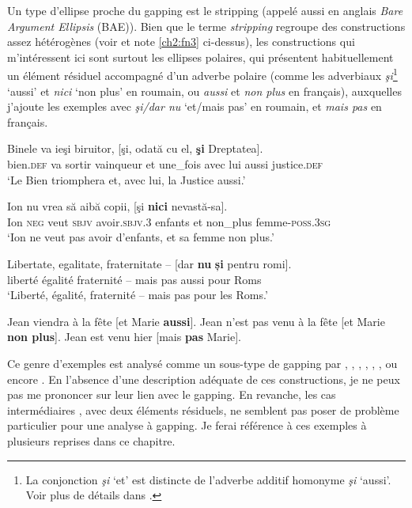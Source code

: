 Un type d’ellipse proche du gapping est le stripping (appelé aussi en anglais \textit{Bare Argument Ellipsis} (BAE)). Bien que le terme \textit{stripping} regroupe des constructions assez hétérogènes (voir \citealt{Abeille2006} et note \ref{ch2:fn3} ci-dessus), les constructions qui m’intéressent ici sont surtout les ellipses polaires, qui présentent habituellement un élément résiduel accompagné d’un adverbe polaire (comme les adverbiaux \textit{şi}\footnote{
 La conjonction \textit{şi} ‘et’ est distincte de l’adverbe additif homonyme \textit{şi} ‘aussi’. Voir plus de détails dans \citet{Bilbiie2008}.} ‘aussi’  et \textit{nici} ‘non plus’  en roumain, ou \textit{aussi}  et \textit{non plus}  en français), auxquelles j’ajoute les exemples avec \textit{şi/dar nu} ‘et/mais pas’  en roumain, et \textit{mais pas}  en français. 

\ea
\ea 
\gll Binele  va  ieşi  biruitor,  [şi,  odată  cu  el,  \textbf{şi}  Dreptatea]. \label{ch2:ex61a}\\
bien.\textsc{def}  va  sortir  vainqueur  et  une\_fois  avec  lui  aussi  justice.\textsc{def}\\ 
\glt ‘Le Bien triomphera et, avec lui, la Justice aussi.’   

\ex  
\gll Ion  nu  vrea  să  aibă  copii,  [şi  \textbf{nici}  nevastă-sa]. \label{ch2:ex61b}\\
Ion  \textsc{neg}  veut  \textsc{sbjv}  avoir.\textsc{sbjv.3}  enfants  et  non\_plus  femme-\textsc{poss.3sg}\\
\glt ‘Ion ne veut pas avoir d’enfants, et sa femme non plus.’      

\ex 
\gll Libertate,  egalitate,  fraternitate –  [dar  \textbf{nu} \textbf{și}  pentru  romi]. \label{ch2:ex61c}\\
liberté  égalité  fraternité –  mais  pas  aussi  pour  Roms\\
\glt ‘Liberté, égalité, fraternité – mais pas pour les Roms.’
\z
\z


\ea
\ea  Jean viendra à la fête [et Marie \textbf{aussi}]. \label{ch2:ex62a}     
\ex  Jean n’est pas venu à la fête [et Marie \textbf{non plus}]. \label{ch2:ex62b}
\ex  Jean est venu hier [mais \textbf{pas} Marie]. \label{ch2:ex62c}
\z
\z

Ce genre d’exemples est analysé comme un sous-type de gapping par \citet{HankamerEtAl1976}, \citet{Williams1977}, \citet{Chao1988}, \citet{Gardent1991}, \citet{Lobeck1995}, \citet{Hendriks1995}, \citet{Hartmann2000} ou encore \citet{Toosarvandani2011}. En l’absence d’une description adéquate de ces constructions, je ne peux pas me prononcer sur leur lien avec le gapping. En revanche, les cas intermédiaires , avec deux éléments résiduels, ne semblent pas poser de problème particulier pour une analyse à gapping. Je ferai référence à ces exemples à plusieurs reprises dans ce chapitre.


